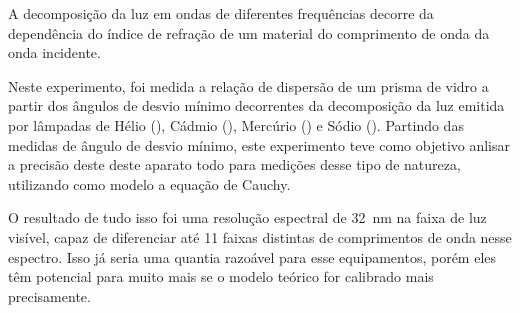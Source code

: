 A decomposição da luz em ondas de diferentes frequências decorre da dependência do índice de refração de um material do comprimento de onda da onda incidente.

Neste experimento, foi medida a relação de dispersão de um prisma de vidro a partir dos ângulos de desvio mínimo decorrentes da decomposição da luz emitida por lâmpadas de Hélio (), Cádmio (), Mercúrio () e Sódio (). Partindo das medidas de ângulo de desvio mínimo, este experimento teve como objetivo anlisar a precisão deste deste aparato todo para medições desse tipo de natureza, utilizando como modelo a equação de Cauchy.

O resultado de tudo isso foi uma resolução espectral de \SI[detect-all = true]{32}{\nano\meter} na faixa de luz visível, capaz de diferenciar até 11 faixas distintas de comprimentos de onda nesse espectro. Isso já seria uma quantia razoável para esse equipamentos, porém eles têm potencial para muito mais se o modelo teórico for calibrado mais precisamente.
